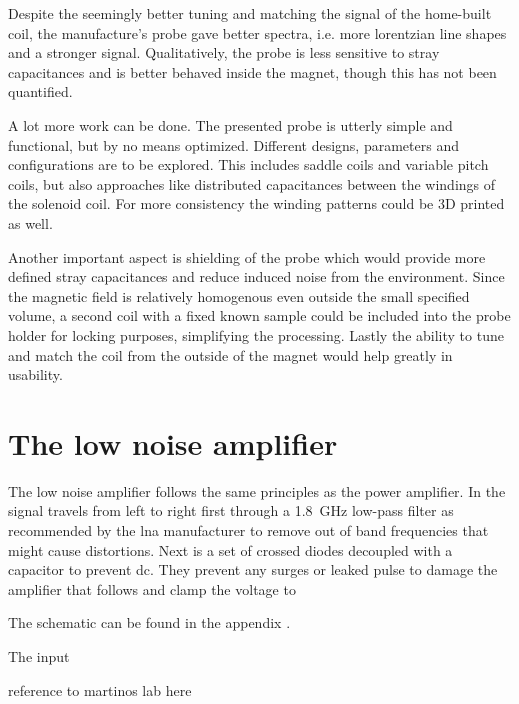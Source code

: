 Despite the seemingly better tuning and matching the signal of the home-built coil, the manufacture's probe gave better spectra, i.e. more lorentzian line shapes and a stronger signal. Qualitatively, the probe is less sensitive to stray capacitances and is better behaved inside the magnet, though this has not been quantified.

A lot more work can be done. The presented probe is utterly simple and functional, but by no means optimized. Different designs, parameters and configurations are to be explored. This includes saddle coils and variable pitch coils, but also approaches like distributed capacitances between the windings of the solenoid coil. For more consistency the winding patterns could be 3D printed as well.

Another important aspect is shielding of the probe which would provide more defined stray capacitances and reduce induced noise from the environment. Since the magnetic field is relatively homogenous even outside the small specified volume, a second coil with a fixed known sample could be included into the probe holder for locking purposes, simplifying the processing. Lastly the ability to tune and match the coil from the outside of the magnet would help greatly in usability.

\section{The low noise amplifier}

The low noise amplifier follows the same principles as the power amplifier. In  the signal travels from left to right first through a \qty{1.8}{\giga\hertz} low-pass filter as recommended by the \acrshort{lna} manufacturer to remove out of band frequencies that might cause distortions. Next is a set of crossed diodes decoupled with a capacitor to prevent \acrshort{dc}. They prevent any surges or leaked pulse to damage the amplifier that follows and clamp the voltage to \

The schematic can be found in the appendix .

The input

reference to martinos lab here

